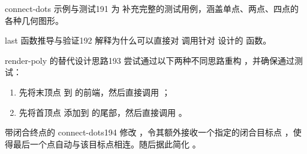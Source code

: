 \begin{exercise}{connect-dots 示例与测试}{191}
为  补充完整的测试用例，涵盖单点、两点、四点的各种几何图形。
\end{exercise}

\begin{exercise}{last 函数推导与验证}{192}
解释为什么可以直接对  调用针对  设计的  函数。
\end{exercise}

\begin{exercise}{render-poly 的替代设计思路}{193}
尝试通过以下两种不同思路重构 ，并确保通过测试：
\begin{enumerate}
  \item 先将末顶点   到  的前端，然后直接调用 ；
  \item 先将首顶点  添加到  的尾部，然后直接调用 。
\end{enumerate}
\end{exercise}

\begin{exercise}{带闭合终点的 connect-dots}{194}
修改 ，令其额外接收一个指定的闭合目标点 ，使得最后一个点自动与该目标点相连。随后据此简化 。
\end{exercise}
